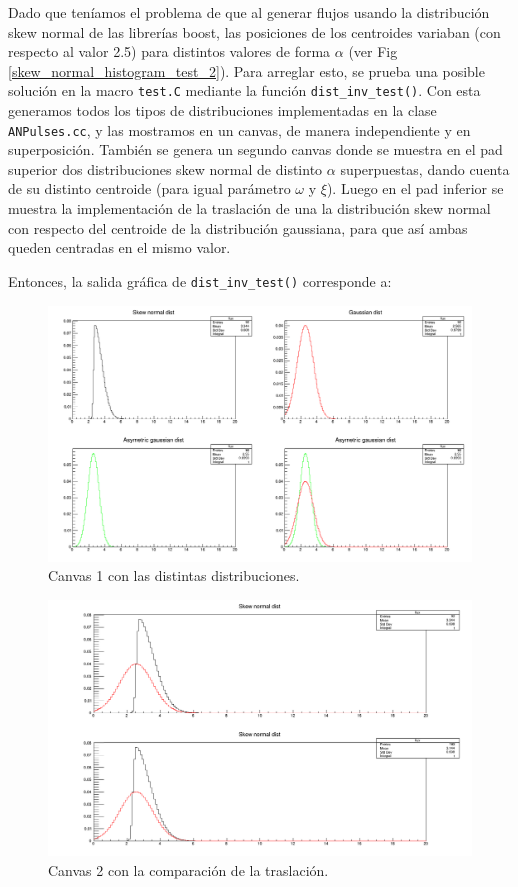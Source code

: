 \documentclass[11pt,letterpaper]{article}
\begin{document}
Dado que teníamos el problema de que al generar flujos usando la distribución skew normal de las librerías boost, las posiciones de los centroides variaban (con respecto al valor 2.5) para distintos valores de forma $\alpha$ (ver Fig \ref{skew_normal_histogram_test_2}). 
Para arreglar esto, se prueba una posible solución en la macro \verb|test.C| mediante la función \verb|dist_inv_test()|. Con esta generamos todos los tipos de distribuciones implementadas en la clase \verb|ANPulses.cc|, y las mostramos en un canvas, de manera independiente y en superposición. También se genera un segundo canvas donde se muestra  en el pad superior dos distribuciones skew normal de distinto $\alpha$ superpuestas, dando cuenta de su distinto centroide (para igual parámetro $\omega$ y $\xi$). Luego en el pad inferior se muestra la implementación de la traslación de una la distribución skew normal con respecto del centroide de la distribución gaussiana, para que así ambas queden centradas en el mismo valor.

Entonces, la salida gráfica de \verb|dist_inv_test()| corresponde a:

\begin{figure}[H]
    \includegraphics[width=1.\textwidth]{img/salida_dist_inv_test_c1.png}
    \centering
     \cprotect\caption{Canvas 1 con las distintas distribuciones.} 
\label{plot_salida_dist_inv_test_c1}
\end{figure}

\begin{figure}[H]
    \includegraphics[width=1.\textwidth]{img/salida_dist_inv_test_c2.png}
    \centering
     \cprotect\caption{Canvas 2 con la comparación de la traslación.} 
\label{plot_salida_dist_inv_test_c2}
\end{figure}
\end{document}
